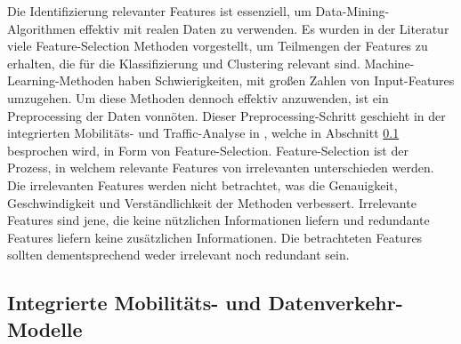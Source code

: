 \documentclass[12pt, a4paper]{article}
\begin{document}
Die Identifizierung relevanter Features ist essenziell, um Data-Mining-Algorithmen effektiv mit realen Daten zu verwenden.
Es wurden in der Literatur viele Feature-Selection Methoden vorgestellt, um Teilmengen der Features zu erhalten,
die für die Klassifizierung und Clustering relevant sind.
Machine-Learning-Methoden haben Schwierigkeiten, mit großen Zahlen von Input-Features
umzugehen. Um diese Methoden dennoch effektiv anzuwenden, ist ein Preprocessing der Daten vonnöten. \cite{Kumar2014}
Dieser Preprocessing-Schritt geschieht in der integrierten Mobilitäts- und Traffic-Analyse in \cite{Alipour2018},
welche in Abschnitt \ref{sec:phase3} besprochen wird, in Form von Feature-Selection. Feature-Selection ist der Prozess,
in welchem relevante Features von irrelevanten unterschieden werden. Die irrelevanten Features werden nicht betrachtet, 
was die Genauigkeit, Geschwindigkeit und Verständlichkeit der Methoden verbessert. Irrelevante Features sind jene, 
die keine nützlichen Informationen liefern und redundante Features liefern keine zusätzlichen Informationen. \cite{Kumar2014}
Die betrachteten Features sollten dementsprechend weder irrelevant noch redundant sein.

\subsection{Integrierte Mobilitäts- und Datenverkehr-Modelle}
\label{sec:phase3}
\end{document}
